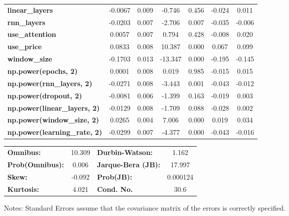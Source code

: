 \begin{center}
\begin{tabular}{lcccccc}
\textbf{linear\_layers}              &      -0.0067  &        0.009     &    -0.746  &         0.456        &       -0.024    &        0.011     \\
\textbf{rnn\_layers}                 &      -0.0203  &        0.007     &    -2.706  &         0.007        &       -0.035    &       -0.006     \\
\textbf{use\_attention}              &       0.0057  &        0.007     &     0.794  &         0.428        &       -0.008    &        0.020     \\
\textbf{use\_price}                  &       0.0833  &        0.008     &    10.387  &         0.000        &        0.067    &        0.099     \\
\textbf{window\_size}                &      -0.1703  &        0.013     &   -13.347  &         0.000        &       -0.195    &       -0.145     \\
\textbf{np.power(epochs, 2)}         &       0.0001  &        0.008     &     0.019  &         0.985        &       -0.015    &        0.015     \\
\textbf{np.power(rnn\_layers, 2)}    &      -0.0271  &        0.008     &    -3.443  &         0.001        &       -0.043    &       -0.012     \\
\textbf{np.power(dropout, 2)}        &      -0.0081  &        0.006     &    -1.399  &         0.163        &       -0.019    &        0.003     \\
\textbf{np.power(linear\_layers, 2)} &      -0.0129  &        0.008     &    -1.709  &         0.088        &       -0.028    &        0.002     \\
\textbf{np.power(window\_size, 2)}   &       0.0265  &        0.004     &     7.006  &         0.000        &        0.019    &        0.034     \\
\textbf{np.power(learning\_rate, 2)} &      -0.0299  &        0.007     &    -4.377  &         0.000        &       -0.043    &       -0.016     \\
\bottomrule
\end{tabular}
\begin{tabular}{lclc}
\textbf{Omnibus:}       & 10.309 & \textbf{  Durbin-Watson:     } &    1.162  \\
\textbf{Prob(Omnibus):} &  0.006 & \textbf{  Jarque-Bera (JB):  } &   17.997  \\
\textbf{Skew:}          & -0.092 & \textbf{  Prob(JB):          } & 0.000124  \\
\textbf{Kurtosis:}      &  4.021 & \textbf{  Cond. No.          } &     30.6  \\
\bottomrule
\end{tabular}
\end{center}

Notes: \newline
 [1] Standard Errors assume that the covariance matrix of the errors is correctly specified.